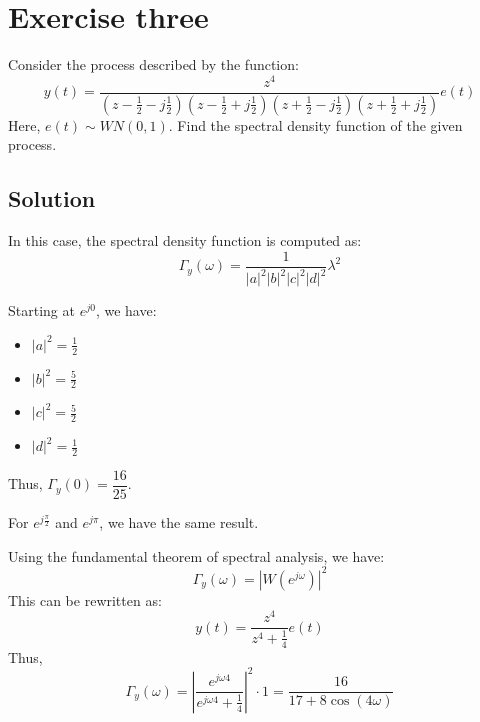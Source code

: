 \section{Exercise three}

Consider the process described by the function:
\[y(t)=\dfrac{z^4}{\left(z-\frac{1}{2}-j\frac{1}{2}\right)\left(z-\frac{1}{2}+j\frac{1}{2}\right)\left(z+\frac{1}{2}-j\frac{1}{2}\right)\left(z+\frac{1}{2}+j\frac{1}{2}\right)}e(t)\]
Here, $e(t) \sim WN(0,1)$. 
Find the spectral density function of the given process.

\subsection*{Solution}
In this case, the spectral density function is computed as:
\[\Gamma_y(\omega)=\dfrac{1}{\left\lvert a \right\rvert^2\left\lvert b \right\rvert^2\left\lvert c \right\rvert^2\left\lvert d \right\rvert^2}\lambda^2\]

Starting at $e^{j0}$, we have:
\begin{itemize}
    \item $\left\lvert a \right\rvert^2=\frac{1}{2}$
    \item $\left\lvert b \right\rvert^2=\frac{5}{2}$
    \item $\left\lvert c \right\rvert^2=\frac{5}{2}$
    \item $\left\lvert d \right\rvert^2=\frac{1}{2}$
\end{itemize}
Thus, $\Gamma_y(0)=\dfrac{16}{25}$. 

For $e^{j\frac{\pi}{2}}$ and $e^{j\pi}$, we have the same result.

Using the fundamental theorem of spectral analysis, we have:
\[\Gamma_y(\omega)=\left\lvert W(e^{j\omega})\right\rvert^2\]
This can be rewritten as:
\[y(t)=\dfrac{z^4}{z^4+\frac{1}{4}}e(t)\]
Thus,
\[\Gamma_y(\omega)=\left\lvert \dfrac{e^{j\omega 4}}{e^{j\omega 4}+\frac{1}{4}}\right\rvert^2 \cdot 1=\dfrac{16}{17+8\cos(4\omega)}\]